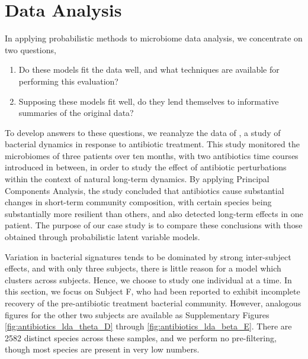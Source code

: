 \documentclass[oupdraft]{bio}
\begin{document}
\section{Data Analysis}
\label{sec:data_analysis}

In applying probabilistic methods to microbiome data analysis, we concentrate on
two questions,
\begin{enumerate}
\item Do these models fit the data well, and what techniques are available for
  performing this evaluation?
\item Supposing these models fit well, do they lend themselves to informative
  summaries of the original data?
\end{enumerate}

To develop answers to these questions, we reanalyze the data of
\cite{dethlefsen2011incomplete}, a study of bacterial dynamics in response to
antibiotic treatment. This study monitored the microbiomes of three patients
over ten months, with two antibiotics time courses introduced in between, in
order to study the effect of antibiotic perturbations within the context of
natural long-term dynamics. By applying Principal Components Analysis, the study
concluded that antibiotics cause substantial changes in short-term community
composition, with certain species being substantially more resilient than
others, and also detected long-term effects in one patient. The purpose of our
case study is to compare these conclusions with those obtained through
probabilistic latent variable models.

Variation in bacterial signatures tends to be dominated by strong inter-subject
effects, and with only three subjects, there is little reason for a model which
clusters across subjects. Hence, we choose to study one individual at a time. In
this section, we focus on Subject F, who had been reported to exhibit incomplete
recovery of the pre-antibiotic treatment bacterial community. However, analogous
figures for the other two subjects are available as Supplementary Figures
\ref{fig:antibiotics_lda_theta_D} through \ref{fig:antibiotics_lda_beta_E}.
There are 2582 distinct species across these samples, and we perform no
pre-filtering, though most species are present in very low numbers.
\end{document}
